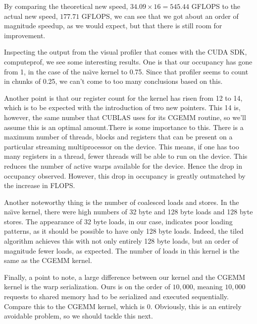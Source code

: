 \documentclass[a4paper,12pt]{report}
\def\flops{{FLOPS}}
\def\gflops{{GFLOPS}}
\begin{document}
By comparing the theoretical new speed, $34.09 \times 16 = 545.44$ \gflops{} to the actual new speed, $177.71$ \gflops{}, we can see that we got about an order of magnitude speedup, as we would expect, but that there is still room for improvement.

Inspecting the output from the visual profiler that comes with the CUDA SDK, computeprof, we see some interesting results.
One is that our occupancy has gone from 1, in the case of the na{\"\i}ve kernel to 0.75.
Since that profiler seems to count in chunks of 0.25, we can't come to too many conclusions based on this.

Another point is that our register count for the kernel has risen from 12 to 14, which is to be expected with the introduction of two new pointers.
This 14 is, however, the same number that CUBLAS uses for its CGEMM routine, so we'll assume this is an optimal amount.There is some importance to this.
There is a maximum number of threads, blocks and registers that can be present on a particular streaming multiprocessor on the device.
This means, if one has too many registers in a thread, fewer threads will be able to run on the device.
This reduces the number of active warps available for the device.
Hence the drop in occupancy observed.
However, this drop in occupancy is greatly outmatched by the increase in \flops{}.

Another noteworthy thing is the number of coalesced loads and stores.
In the na{\"\i}ve kernel, there were high numbers of 32 byte and 128 byte loads and 128 byte stores.
The appearance of 32 byte loads, in our case, indicates poor loading patterns, as it should be possible to have only 128 byte loads.
Indeed, the tiled algorithm achieves this with not only entirely 128 byte loads, but an order of magnitude fewer loads, as expected.
The number of loads in this kernel is the same as the CGEMM kernel.

Finally, a point to note, a large difference between our kernel and the CGEMM kernel is the warp serialization.
Ours is on the order of $10,000$, meaning $10,000$ requests to shared memory had to be serialized and executed sequentially.
Compare this to the CGEMM kernel, which is 0.
Obviously, this is an entirely avoidable problem, so we should tackle this next.
\end{document}
